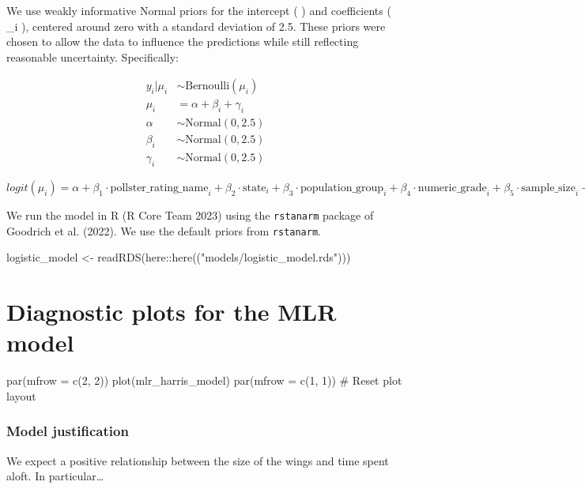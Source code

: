 \documentclass[
  letterpaper,
  DIV=11,
  numbers=noendperiod]{scrartcl}
\newenvironment{Shaded}{\begin{snugshade}}{\end{snugshade}}
\newcommand{\FunctionTok}[1]{\textcolor[rgb]{0.28,0.35,0.67}{#1}}
\newcommand{\NormalTok}[1]{\textcolor[rgb]{0.00,0.23,0.31}{#1}}
\newcommand{\OtherTok}[1]{\textcolor[rgb]{0.00,0.23,0.31}{#1}}
\newcommand{\SpecialCharTok}[1]{\textcolor[rgb]{0.37,0.37,0.37}{#1}}
\newcommand{\StringTok}[1]{\textcolor[rgb]{0.13,0.47,0.30}{#1}}
\begin{document}
We use weakly informative Normal priors for the intercept ( \alpha ) and
coefficients ( \beta\_i ), centered around zero with a standard
deviation of 2.5. These priors were chosen to allow the data to
influence the predictions while still reflecting reasonable uncertainty.
Specifically:

\begin{align*}
y_i | \mu_i &\sim \text{Bernoulli}(\mu_i) \\
\mu_i &= \alpha + \beta_i + \gamma_i \\
\alpha &\sim \text{Normal}(0, 2.5) \\
\beta_i &\sim \text{Normal}(0, 2.5) \\
\gamma_i &\sim \text{Normal}(0, 2.5)
\end{align*}

\(logit(\mu_i) = \alpha + \beta_1 \cdot \text{pollster\_rating\_name}_i + \beta_2 \cdot \text{state}_i + \beta_3 \cdot \text{population\_group}_i + \beta_4 \cdot \text{numeric\_grade}_i + \beta_5 \cdot \text{sample\_size}_i + \beta_6 \cdot \text{methodology}_i\)

We run the model in R (R Core Team 2023) using the \texttt{rstanarm}
package of Goodrich et al. (2022). We use the default priors from
\texttt{rstanarm}.

\begin{Shaded}
\begin{Highlighting}[]
\NormalTok{logistic\_model }\OtherTok{\textless{}{-}} \FunctionTok{readRDS}\NormalTok{(here}\SpecialCharTok{::}\FunctionTok{here}\NormalTok{((}\StringTok{"models/logistic\_model.rds"}\NormalTok{)))}
\end{Highlighting}
\end{Shaded}

\section{Diagnostic plots for the MLR
model}\label{diagnostic-plots-for-the-mlr-model}

par(mfrow = c(2, 2)) plot(mlr\_harris\_model) par(mfrow = c(1, 1)) \#
Reset plot layout

\subsubsection{Model justification}\label{model-justification}

We expect a positive relationship between the size of the wings and time
spent aloft. In particular\ldots{}
\end{document}
